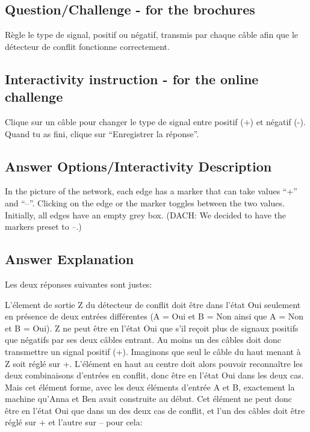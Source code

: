 \documentclass[a4paper,11pt]{report}
\newcommand{\taskGraphicsFolder}{..}
\begin{document}
{\em


\subsection*{Question/Challenge - for the brochures}

Règle le type de signal, positif ou négatif, transmis par chaque câble afin que le détecteur de conflit fonctionne correctement.

{\centering%
\par}

}


\subsection*{Interactivity instruction - for the online challenge}

Clique sur un câble pour changer le type de signal entre positif (+) et négatif (-). Quand tu as fini, clique sur “Enregistrer la réponse”.

\begingroup
\renewcommand{\arraystretch}{1.5}
\subsection*{Answer Options/Interactivity Description}

In the picture of the network, each edge has a marker that can take values “+” and “–”. Clicking on the edge or the marker toggles between the two values. Initially, all edges have an empty grey box.  (DACH: We decided to have the markers preset to –.)

\endgroup

\subsection*{Answer Explanation}

Les deux réponses suivantes sont justes:

{\centering%
\raisebox{-0.5ex}{} \raisebox{-0.5ex}{}\par}

L’élement de sortie Z du détecteur de conflit doit être dans l’état Oui seulement en présence de deux entrées différentes (A = Oui et B = Non ainsi que A = Non et B = Oui). Z ne peut être en l’état Oui que s’il reçoit plus de signaux positifs que négatifs par ses deux câbles entrant. Au moins un des câbles doit donc transmettre un signal positif (+). Imaginons que seul le câble du haut menant à Z soit réglé sur +. L’élément en haut au centre doit alors pouvoir reconnaître les deux combinaisons d’entrées en conflit, donc être en l’état Oui dans les deux cas. Mais cet élément forme, avec les deux éléments d’entrée A et B, exactement la machine qu’Anna et Ben avait construite au début. Cet élément ne peut donc être en l’état Oui que dans un des deux cas de conflit, et l’un des câbles doit être réglé sur + et l’autre sur – pour cela:
\end{document}
